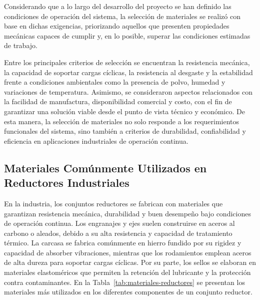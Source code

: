 \documentclass[conference]{IEEEtran}
\begin{document}
Considerando que a lo largo del desarrollo del proyecto se han definido las condiciones de
operación del sistema, la selección de materiales se realizó con base en dichas exigencias,
priorizando aquellos que presenten propiedades mecánicas capaces de cumplir y, en lo
posible, superar las condiciones estimadas de trabajo.

Entre los principales criterios de selección se encuentran la resistencia mecánica, la
capacidad de soportar cargas cíclicas, la resistencia al desgaste y la estabilidad frente
a condiciones ambientales como la presencia de polvo, humedad y variaciones de
temperatura. Asimismo, se consideraron aspectos relacionados con la facilidad de
manufactura, disponibilidad comercial y costo, con el fin de garantizar una solución viable
desde el punto de vista técnico y económico. De esta manera, la selección de materiales no
solo responde a los requerimientos funcionales del sistema, sino también a criterios de
durabilidad, confiabilidad y eficiencia en aplicaciones industriales de operación continua.

\subsection{Materiales Comúnmente Utilizados en Reductores Industriales}

En la industria, los conjuntos reductores se fabrican con materiales que garantizan
resistencia mecánica, durabilidad y buen desempeño bajo condiciones de operación continua.
Los engranajes y ejes suelen construirse en aceros al carbono o aleados, debido a su alta
resistencia y capacidad de tratamiento térmico. La carcasa se fabrica comúnmente en hierro
fundido por su rigidez y capacidad de absorber vibraciones, mientras que los rodamientos
emplean aceros de alta dureza para soportar cargas cíclicas. Por su parte, los sellos se
elaboran en materiales elastoméricos que permiten la retención del lubricante y la
protección contra contaminantes. En la Tabla~\ref{tab:materiales-reductores} se presentan
los materiales más utilizados en los diferentes componentes de un conjunto reductor.
\end{document}
